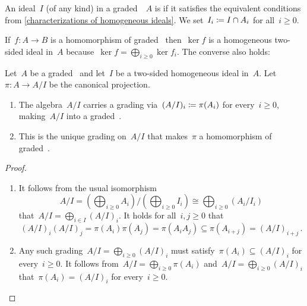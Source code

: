 \begin{definition}
  An ideal~$I$ (of any kind) in a graded~{\algebra{$\kf$}}~$A$ is  if it satisfies the equivalent conditions from \cref{characterizations of homogeneous ideals}.
  We set~$I_i \coloneqq I \cap A_i$ for all~$i \geq 0$.
\end{definition}


\begin{example}
  If~$f \colon A \to B$ is a homomorphism of graded~{\algebras{$\kf$}} then~$\ker f$ is a homogeneous two-sided ideal in~$A$ because~$\ker f = \bigoplus_{i \geq 0} \ker f_i$.
  The converse also holds:
\end{example}


\begin{proposition}
  Let~$A$ be a graded~{\algebra{$\kf$}} and let~$I$ be a two-sided homogeneous ideal in~$A$.
  Let~$\pi \colon A \to A/I$ be the canonical projection.
  \begin{enumerate}
    \item
      The algebra~$A/I$ carries a grading via~$(A/I)_i \coloneqq \pi(A_i)$ for every~$i \geq 0$, making~$A/I$ into a graded~{\algebra{$\kf$}}.
    \item
      This is the unique grading on~$A/I$ that makes~$\pi$ a homomorphism of graded~{\algebras{$\kf$}}.
  \end{enumerate}
\end{proposition}


\begin{proof}
  \leavevmode
  \begin{enumerate}
    \item
      It follows from the usual isomorphism
      \[
        A/I
        =
        \left( \bigoplus_{i \geq 0} A_i \right)
        \bigg/
        \left(\bigoplus_{i \geq 0} I_i \right)
        \cong
        \bigoplus_{i \geq 0} (A_i / I_i)
      \]
      that~$A/I = \bigoplus_{i \in I} (A/I)_i$.
      It holds for all~$i, j \geq 0$ that
      \[
        (A/I)_i (A/I)_j
        =
        \pi(A_i) \pi(A_j)
        =
        \pi(A_i A_j)
        \subseteq
        \pi(A_{i+j})
        =
        (A/I)_{i+j} \,.
      \]
    \item
      Any such grading~$A/I = \bigoplus_{i \geq 0} (A/I)_i$ must satisfy~$\pi(A_i) \subseteq (A/I)_i$ for every~$i \geq 0$.
      It follows from~$A/I = \bigoplus_{i \geq 0} \pi(A_i)$ and~$A/I = \bigoplus_{i \geq 0} (A/I)_i$ that~$\pi(A_i) = (A/I)_i$ for every~$i \geq 0$.
    \qedhere
  \end{enumerate}
\end{proof}


